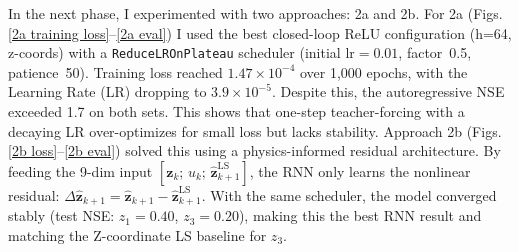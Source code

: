 \documentclass[12pt]{article}
\begin{document}

In the next phase, I experimented with two approaches: 2a and 2b. For 2a (Figs. \ref{2a training loss}--\ref{2a eval}) I used the best closed-loop ReLU configuration (h=64, z-coords) with a \texttt{ReduceLROnPlateau} scheduler (initial $\text{lr}{=}0.01$, factor~0.5, patience~50). Training loss reached $1.47\times10^{-4}$ over 1,000 epochs, with the Learning Rate (LR) dropping to $3.9\times10^{-5}$. Despite this, the autoregressive NSE exceeded 1.7 on both sets. This shows that one-step teacher-forcing with a decaying LR over-optimizes for small loss but lacks stability. Approach 2b (Figs. \ref{2b loss}--\ref{2b eval}) solved this using a physics-informed residual architecture. By feeding the 9-dim input $[\mathbf{z}_k;\,u_k;\,\hat{\mathbf{z}}_{k+1}^{\text{LS}}]$, the RNN only learns the nonlinear residual: $\Delta\hat{\mathbf{z}}_{k+1}=\hat{\mathbf{z}}_{k+1}-\hat{\mathbf{z}}_{k+1}^{\text{LS}}$. With the same scheduler, the model converged stably (test NSE: $z_1{=}0.40$, $z_3{=}0.20$), making this the best RNN result and matching the Z-coordinate LS baseline for $z_3$.

\end{document}
